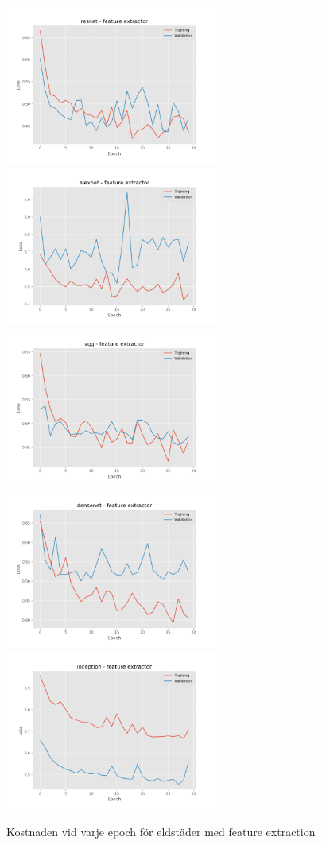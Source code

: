 \documentclass[]{kththesis}
\begin{document}
  \begin{figure}[h]
    \includegraphics[width=7cm]{f_l_resnet_fe}
    \includegraphics[width=7cm]{f_l_alexnet_fe}
    \includegraphics[width=7cm]{f_l_vgg_fe}
    \includegraphics[width=7cm]{f_l_densenet_fe}
    \includegraphics[width=7cm]{f_l_inception_fe}
    \caption{Kostnaden vid varje epoch för eldstäder med feature extraction}
    \label{fig:f_l_1}
  \end{figure}
  
\end{document}
